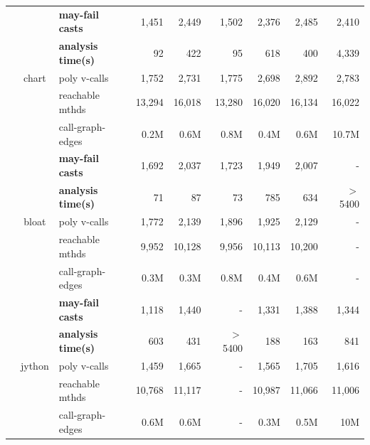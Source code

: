 \begin{table}[]
\begin{tabular}{|c| c | l |r| r r || r | r  r |}
&\multirow{5}{*}{chart}
                          & \textbf{may-fail casts} &1,451 & 2,449 & 1,502 & 2,376 & 2,485 & 2,410     \\
&                          & \textbf{analysis time(s)} &92 & 422 & 95 & 618 & 400 & 4,339    \\
&                          & poly v-calls     &1,752 & 2,731 & 1,775 & 2,698 & 2,892 & 2,783     \\
&                          & reachable mthds  &13,294 & 16,018 & 13,280 & 16,020 & 16,134 & 16,022     \\
&                          & call-graph-edges &0.2M & 0.6M & 0.8M & 0.4M & 0.6M & 10.7M    \\ \cline{2-9}

&\multirow{5}{*}{bloat}
                          & \textbf{may-fail casts} &1,692 & 2,037  & 1,723 &1,949&2,007&-    \\
&                          & \textbf{analysis time(s)} &71 & 87 & 73 &785&634&$>$5400    \\
&                          & poly v-calls     &1,772 & 2,139 & 1,896 &1,925&2,129&-    \\
&                          & reachable mthds  &9,952 & 10,128 & 9,956 &10,113&10,200&-     \\
&                          & call-graph-edges  &0.3M & 0.3M & 0.8M &0.4M&0.6M&-    \\ \cline{2-9}

&\multirow{5}{*}{jython}
                          & \textbf{may-fail casts} & 1,118 & 1,440 &-  & 1,331 & 1,388 & 1,344      \\
&                          & \textbf{analysis time(s)} & 603 & 431 &$>$5400 & 188 & 163 & 841     \\
&                          & poly v-calls     & 1,459 & 1,665 &- & 1,565 & 1,705 & 1,616       \\
&                          & reachable mthds  & 10,768 & 11,117 &- & 10,987 & 11,066 & 11,006      \\
&                          & call-graph-edges & 0.6M & 0.6M &- & 0.3M & 0.5M & 10M     \\ \cline{1-9}

\end{tabular}
\end{table}

